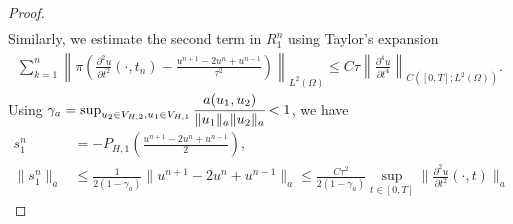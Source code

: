 \documentclass[preprint,12pt]{elsarticle}
\begin{document}
\begin{proof}
\begin{equation}
\begin{aligned}
\end{aligned}
\end{equation}
Similarly, we estimate the second term in $R_1^n$ using Taylor's expansion
\begin{equation}\label{T2.4}
\begin{aligned}
     \sum_{k=1}^n\left\|\pi\left(\frac{\partial^2u}{\partial t^2}(\cdot,t_n)-\frac{u^{n+1}-2u^n+u^{n-1}}{\tau^2}\right)\right\|_{L^2(\Omega)}\leq C\tau\left\|\frac{\partial^4 u}{\partial t^4}\right\|_{C([0,T];L^2(\Omega))}.
\end{aligned}
\end{equation}
Using $\gamma_a = \sup_{u_2\in V_{H,2},u_1\in V_{H,1}}\cfrac{a(u_1,u_2)}{\|u_1\|_a\|u_2\|_a}<1$, we have
\begin{equation}
\begin{aligned}
    s_1^n&=-P_{H,1}\left(\frac{u^{n+1}-2u^n+u^{n-1}}{2}\right),\\
    \|s_1^n\|_a&\leq \frac{1}{2(1-\gamma_a)}\|u^{n+1}-2u^n+u^{n-1}\|_a\leq\frac{C\tau^2}{2(1-\gamma_a)}\sup_{t\in[0,T]}\|\frac{\partial^2u}{\partial t^2}(\cdot,t)\|_a
\end{aligned}
\end{equation}
\end{proof}
\end{document}
